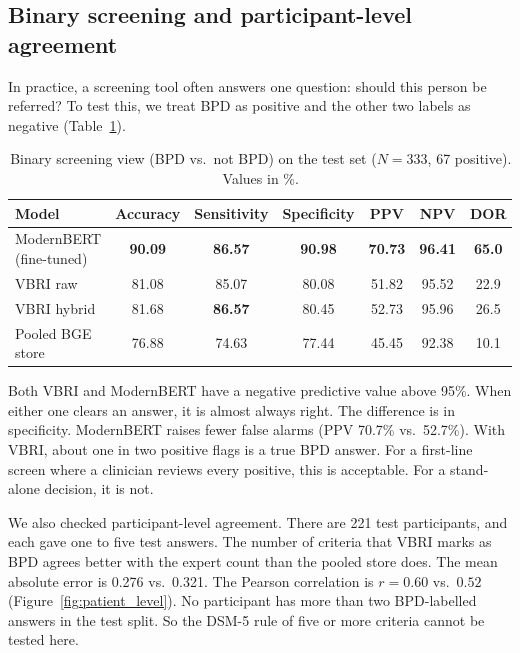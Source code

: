 \documentclass[11pt]{article}
\newcommand{\vbri}{VBRI}
\newcommand{\dsmv}{DSM-5}
\begin{document}
\subsection{Binary screening and participant-level agreement}

In practice, a screening tool often answers one question: should this person be referred? To test
this, we treat BPD as positive and the other two labels as negative (Table~\ref{tab:screening}).

\begin{table}[H]
\centering
\caption{Binary screening view (BPD vs.\ not BPD) on the test set ($N=333$, 67 positive). Values in \%.}
\label{tab:screening}
\small
\begin{tabular}{@{}lcccccc@{}}
\toprule
\textbf{Model} & \textbf{Accuracy} & \textbf{Sensitivity} & \textbf{Specificity} & \textbf{PPV} & \textbf{NPV} & \textbf{DOR} \\
\midrule
ModernBERT (fine-tuned) & \textbf{90.09} & \textbf{86.57} & \textbf{90.98} & \textbf{70.73} & \textbf{96.41} & \textbf{65.0} \\
\vbri{} raw             & 81.08 & 85.07 & 80.08 & 51.82 & 95.52 & 22.9 \\
\vbri{} hybrid          & 81.68 & \textbf{86.57} & 80.45 & 52.73 & 95.96 & 26.5 \\
Pooled BGE store        & 76.88 & 74.63 & 77.44 & 45.45 & 92.38 & 10.1 \\
\bottomrule
\end{tabular}
\end{table}

Both \vbri{} and ModernBERT have a negative predictive value above 95\%. When either one clears an
answer, it is almost always right. The difference is in specificity. ModernBERT raises fewer false
alarms (PPV 70.7\% vs.\ 52.7\%). With \vbri{}, about one in two positive flags is a true BPD answer.
For a first-line screen where a clinician reviews every positive, this is acceptable. For a
stand-alone decision, it is not.

We also checked participant-level agreement. There are 221 test participants, and each gave one to
five test answers. The number of criteria that \vbri{} marks as BPD agrees better with the expert
count than the pooled store does. The mean absolute error is 0.276 vs.\ 0.321. The Pearson
correlation is $r=0.60$ vs.\ $0.52$ (Figure~\ref{fig:patient_level}). No participant has more than
two BPD-labelled answers in the test split. So the \dsmv{} rule of five or more criteria cannot be
tested here.
\end{document}
